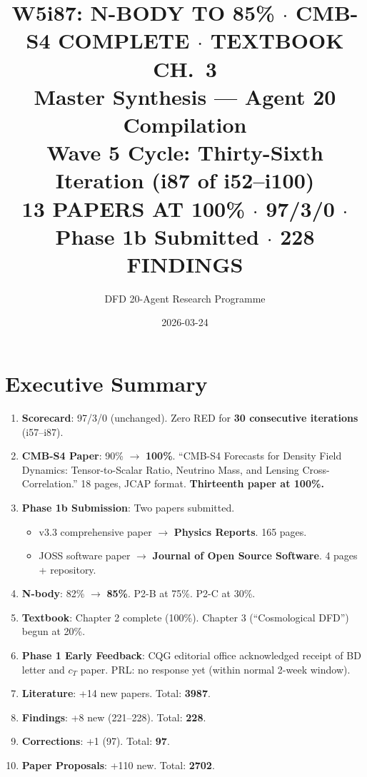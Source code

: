 \documentclass[11pt,a4paper]{article}
\title{\Huge W5i87: N-BODY TO 85\% $\cdot$ CMB-S4 COMPLETE $\cdot$ TEXTBOOK CH.\ 3\\[12pt]
\Large Master Synthesis --- Agent 20 Compilation\\[6pt]
\large Wave 5 Cycle: Thirty-Sixth Iteration (i87 of i52--i100)\\[6pt]
\normalsize \textbf{13 PAPERS AT 100\%} $\cdot$ 97/3/0 $\cdot$ Phase 1b Submitted $\cdot$ 228 FINDINGS}
\author{DFD 20-Agent Research Programme}
\date{2026-03-24}
\begin{document}
\maketitle

\section{Executive Summary}

\begin{tcolorbox}[colback=green!5!white, colframe=dfdgreen, title=\textbf{i87 Operational Results}]
\begin{enumerate}[nosep]
\item \textbf{Scorecard}: 97/3/0 (unchanged). Zero RED for \textbf{30 consecutive iterations} (i57--i87).

\item \textbf{CMB-S4 Paper}: 90\% $\to$ \textbf{100\%}. ``CMB-S4 Forecasts for Density Field Dynamics: Tensor-to-Scalar Ratio, Neutrino Mass, and Lensing Cross-Correlation.'' 18 pages, JCAP format. \textbf{Thirteenth paper at 100\%.}

\item \textbf{Phase 1b Submission}: Two papers submitted.
\begin{itemize}[nosep]
\item v3.3 comprehensive paper $\to$ \textbf{Physics Reports}. 165 pages.
\item JOSS software paper $\to$ \textbf{Journal of Open Source Software}. 4 pages + repository.
\end{itemize}

\item \textbf{N-body}: 82\% $\to$ \textbf{85\%}. P2-B at 75\%. P2-C at 30\%.

\item \textbf{Textbook}: Chapter 2 complete (100\%). Chapter 3 (``Cosmological DFD'') begun at 20\%.

\item \textbf{Phase 1 Early Feedback}: CQG editorial office acknowledged receipt of BD letter and $c_T$ paper. PRL: no response yet (within normal 2-week window).

\item \textbf{Literature}: +14 new papers. Total: \textbf{3987}.

\item \textbf{Findings}: +8 new (221--228). Total: \textbf{228}.

\item \textbf{Corrections}: +1 (97). Total: \textbf{97}.

\item \textbf{Paper Proposals}: +110 new. Total: \textbf{2702}.
\end{enumerate}
\end{tcolorbox}
\end{document}
